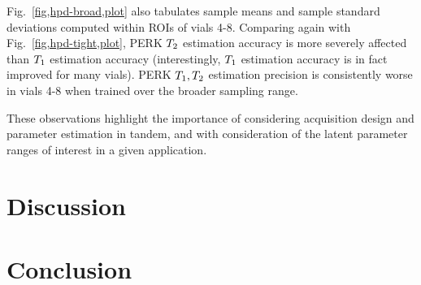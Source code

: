 Fig.~\ref{fig,hpd-broad,plot}
also tabulates sample means and sample standard deviations
computed within ROIs of vials 4-8.
Comparing again with Fig.~\ref{fig,hpd-tight,plot},
PERK $T_2$ estimation accuracy
is more severely affected 
than $T_1$ estimation accuracy
(interestingly,
$T_1$ estimation accuracy 
is in fact improved for many vials).
PERK $T_1,T_2$ estimation precision
is consistently worse in vials 4-8
when trained over the broader sampling range.

These observations highlight the importance 
of considering acquisition design
and parameter estimation in tandem,
and with consideration
of the latent parameter ranges of interest
in a given application.

\section{Discussion}
\label{s,perk,disc}

\section{Conclusion}
\label{s,perk,conc}
